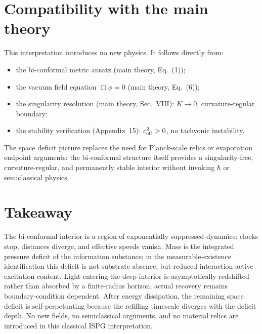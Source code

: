 \documentclass[11pt]{article}
\begin{document}
\section{Compatibility with the main theory}\label{sec:compat}

This interpretation introduces no new physics. It follows directly from:
\begin{itemize}
\item the bi-conformal metric ansatz (main theory, Eq.~(1));
\item the vacuum field equation $\Box\phi = 0$ (main theory, Eq.~(6));
\item the singularity resolution (main theory, Sec.~VIII): $K \to 0$, curvature-regular boundary;
\item the stability verification (Appendix~15): $c_{\rm eff}^2 > 0$, no tachyonic instability.
\end{itemize}
The space deficit picture replaces the need for Planck-scale relics or evaporation endpoint arguments: the bi-conformal structure itself provides a singularity-free, curvature-regular, and permanently stable interior without invoking $\hbar$ or semiclassical physics.

\section*{Takeaway}
The bi-conformal interior is a region of exponentially suppressed dynamics: clocks stop, distances diverge, and effective speeds vanish. Mass is the integrated pressure deficit of the information substance; in the measurable-existence identification this deficit is not substrate absence, but reduced interaction-active excitation content. Light entering the deep interior is asymptotically redshifted rather than absorbed by a finite-radius horizon; actual recovery remains boundary-condition dependent. After energy dissipation, the remaining space deficit is self-perpetuating because the refilling timescale diverges with the deficit depth. No new fields, no semiclassical arguments, and no material relics are introduced in this classical ISPG interpretation.
\end{document}
